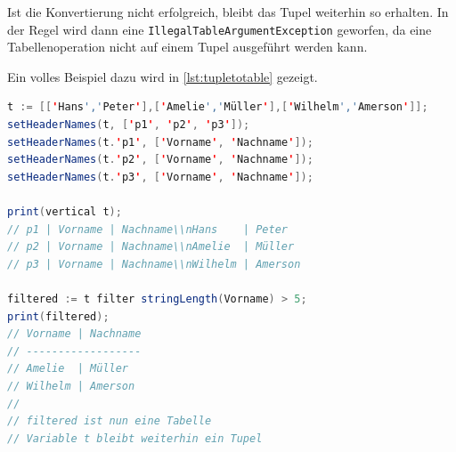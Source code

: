 Ist die Konvertierung nicht erfolgreich, bleibt das Tupel weiterhin so erhalten. In der Regel wird dann eine \lstinline{IllegalTableArgumentException} geworfen,
da eine Tabellenoperation nicht auf einem Tupel ausgeführt werden kann.

Ein volles Beispiel dazu wird in \ref{lst:tupletotable} gezeigt.

\begin{lstlisting}[caption={Tupel zu Tabellen-Konvertierung}, label={lst:tupletotable}, language=Java]
t := [['Hans','Peter'],['Amelie','Müller'],['Wilhelm','Amerson']];
setHeaderNames(t, ['p1', 'p2', 'p3']);
setHeaderNames(t.'p1', ['Vorname', 'Nachname']);
setHeaderNames(t.'p2', ['Vorname', 'Nachname']);
setHeaderNames(t.'p3', ['Vorname', 'Nachname']);

print(vertical t);
// p1 | Vorname | Nachname\\nHans    | Peter
// p2 | Vorname | Nachname\\nAmelie  | Müller
// p3 | Vorname | Nachname\\nWilhelm | Amerson

filtered := t filter stringLength(Vorname) > 5;
print(filtered);
// Vorname | Nachname
// ------------------
// Amelie  | Müller
// Wilhelm | Amerson
//
// filtered ist nun eine Tabelle
// Variable t bleibt weiterhin ein Tupel
\end{lstlisting}
